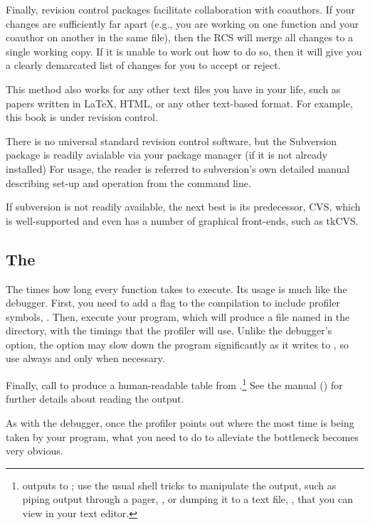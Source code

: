 Finally, revision control packages facilitate collaboration with
coauthors. If your changes are sufficiently far apart (e.g., you are
working on one function and your coauthor on another in the same file),
then the RCS will merge all changes to a single working copy. If
it is unable to work out how to do so, then it will give you a
clearly demarcated list of changes for you to accept or reject.

This method also works for any other text files you have in your
life, such as papers written in \LaTeX, HTML, or any other text-based
format. For example, this book is under revision control.

There is no universal standard revision control software, but the
Subversion package is readily avialable via your package manager (if it is
not already installed) For usage, the reader is referred to subversion's
own detailed manual describing set-up and operation from the command line.

If subversion is not readily available, the next best is its predecessor,
CVS, which is well-supported and even has a number of graphical
front-ends, such as tkCVS.  

\subsection{The } The  times how long every function
takes to execute. Its usage is much like the debugger. First, you need
to add a flag to the compilation to include profiler symbols,
. Then, execute your program, which will produce a file named
 in the directory, with the timings that the profiler
will use. Unlike the debugger's  option, the 
option may slow down the program significantly as it writes to
, so use  always and  only
when necessary.

Finally, call  to produce a
human-readable table from .\footnote{
outputs to ; use the usual shell tricks to manipulate
the output, such as piping output through a pager, , or dumping it to a text file, , that you can view in your text editor.}
See the manual () for further details about reading
the output.

As with the debugger, once the profiler points out where the most time
is being taken by your program, what you need to do to alleviate the
bottleneck becomes very obvious.

